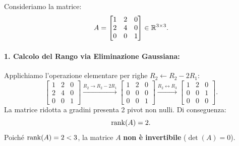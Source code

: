 \begin{example}
Consideriamo la matrice:
\begin{equation}
    A = \begin{bmatrix} 1 & 2 & 0 \\ 2 & 4 & 0 \\ 0 & 0 & 1 \end{bmatrix} \in \mathbb{R}^{3 \times 3}.
\end{equation}

\paragraph{1. Calcolo del Rango via Eliminazione Gaussiana:}
Applichiamo l'operazione elementare per righe $R_2 \leftarrow R_2 - 2R_1$:
\begin{equation}
    \begin{bmatrix} 1 & 2 & 0 \\ 2 & 4 & 0 \\ 0 & 0 & 1 \end{bmatrix}
    \xrightarrow{R_2 \to R_2 - 2R_1}
    \begin{bmatrix} 1 & 2 & 0 \\ 0 & 0 & 0 \\ 0 & 0 & 1 \end{bmatrix}
    \xrightarrow{R_2 \leftrightarrow R_3}
    \begin{bmatrix} 1 & 2 & 0 \\ 0 & 0 & 1 \\ 0 & 0 & 0 \end{bmatrix}.
\end{equation}
La matrice ridotta a gradini presenta 2 pivot non nulli. Di conseguenza:
\begin{equation}
    \operatorname{rank}(A) = 2.
\end{equation}
Poich\'e $\operatorname{rank}(A) = 2 < 3$, la matrice $A$ \textbf{non \`e invertibile} ($\det(A) = 0$).


\end{example}
